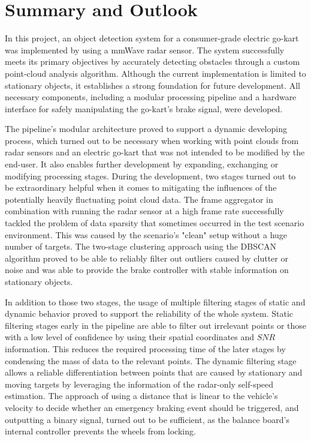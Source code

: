 \section{Summary and Outlook}

In this project, an object detection system for a consumer-grade electric go-kart was implemented by using a mmWave radar sensor.
The system successfully meets its primary objectives by accurately detecting obstacles through a custom point-cloud analysis algorithm.
Although the current implementation is limited to stationary objects, it establishes a strong foundation for future development.
All necessary components, including a modular processing pipeline and a hardware interface for safely manipulating the go-kart's brake signal, were developed.
\par
The pipeline's modular architecture proved to support a dynamic developing process, which turned out to be necessary when working with point clouds from radar sensors and an electric go-kart that was not intended to be modified by the end-user.
It also enables further development by expanding, exchanging or modifying processing stages.
During the development, two stages turned out to be extraordinary helpful when it comes to mitigating the influences of the potentially heavily fluctuating point cloud data.
The frame aggregator in combination with running the radar sensor at a high frame rate successfully tackled the problem of data sparsity that sometimes occurred in the test scenario environment.
This was caused by the scenario's "clean" setup without a huge number of targets.
The two-stage clustering approach using the DBSCAN algorithm proved to be able to reliably filter out outliers caused by clutter or noise and was able to provide the brake controller with stable information on stationary objects.
\par
In addition to those two stages, the usage of multiple filtering stages of static and dynamic behavior proved to support the reliability of the whole system.
Static filtering stages early in the pipeline are able to filter out irrelevant points or those with a low level of confidence by using their spatial coordinates and $SNR$ information.
This reduces the required processing time of the later stages by condensing the mass of data to the relevant points.
The dynamic filtering stage allows a reliable differentiation between points that are caused by stationary and moving targets by leveraging the information of the radar-only self-speed estimation.
The approach of using a distance that is linear to the vehicle's velocity to decide whether an emergency braking event should be triggered, and outputting a binary signal, turned out to be sufficient, as the balance board's internal controller prevents the wheels from locking.
